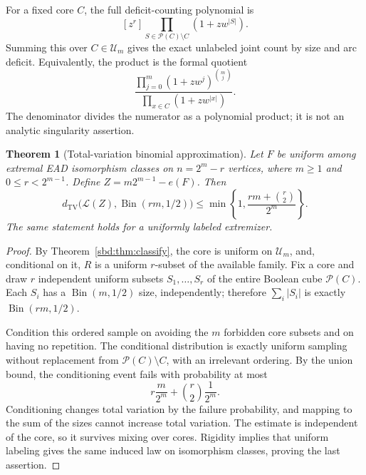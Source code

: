\documentclass[11pt,a4paper]{article}
\newtheorem{theorem}{Theorem}[section]
\theoremstyle{definition}
\newcommand{\PP}{\mathcal P}
\newcommand{\U}{\mathcal U}
\newcommand{\TV}{d_{\mathrm{TV}}}
\DeclareMathOperator{\Bin}{Bin}
\begin{document}
For a fixed core $C$, the full deficit-counting polynomial is
\begin{equation}\label{sbd:eq:arc-poly}
 [z^r]\prod_{S\in\PP(C)\setminus C}(1+z w^{|S|}).
\end{equation}
Summing this over $C\in\U_m$ gives the exact unlabeled joint count by
size and arc deficit. Equivalently, the product is the formal quotient
\[
 \frac{\displaystyle\prod_{j=0}^{m}(1+z w^j)^{\binom mj}}
      {\displaystyle\prod_{x\in C}(1+z w^{|x|})}.
\]
The denominator divides the numerator as a polynomial product; it is
not an analytic singularity assertion.

\begin{theorem}[Total-variation binomial approximation]\label{sbd:thm:binomial}
Let $F$ be uniform among extremal EAD isomorphism classes on $n=2^m-r$
vertices, where $m\ge1$ and $0\le r<2^{m-1}$. Define
$Z=m2^{m-1}-e(F)$. Then
\begin{equation}\label{sbd:eq:tvbin}
 \boxed{\quad
 \TV\bigl(\mathcal L(Z),\Bin(rm,1/2)\bigr)
 \le \min\left\{1,\frac{rm+\binom r2}{2^m}\right\}.
 \quad}
\end{equation}
The same statement holds for a uniformly labeled extremizer.
\end{theorem}
\begin{proof}
By Theorem~\ref{sbd:thm:classify}, the core is uniform on $\U_m$, and,
conditional on it, $R$ is a uniform $r$-subset of the available family.
Fix a core and draw $r$ independent uniform subsets
$S_1,\ldots,S_r$ of the entire Boolean cube $\PP(C)$.
Each $S_i$ has a $\Bin(m,1/2)$ size, independently; therefore
$\sum_i|S_i|$ is exactly $\Bin(rm,1/2)$.

Condition this ordered sample on avoiding the $m$ forbidden core
subsets and on having no repetition. The conditional distribution is
exactly uniform sampling without replacement from
$\PP(C)\setminus C$, with an irrelevant ordering. By the union bound,
the conditioning event fails with probability at most
\[
 r\frac{m}{2^m}+\binom r2\frac1{2^m}.
\]
Conditioning changes total variation by the failure probability, and
mapping to the sum of the sizes cannot increase total variation.
The estimate is independent of the core, so it survives mixing over
cores. Rigidity implies that uniform labeling gives the same induced
law on isomorphism classes, proving the last assertion.
\end{proof}
\end{document}
